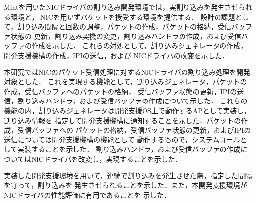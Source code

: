 \documentclass[submit,techreq,noauthor,dvipdfmx]{ipsj}
\begin{document}
Mintを用いたNICドライバの割り込み開発環境では，実割り込みを発生させられる環境と，
NICを用いずパケットを授受する環境を提供する．
設計の課題として，割り込み間隔と回数の調整，パケットの作成，パケットの格納，受信バッファ状態の
更新，割り込み契機の変更，割り込みハンドラの作成，および受信バッファの作成を示した．
これらの対処として，割り込みジェネレータの作成，開発支援機構の作成，IPIの送信，および
NICドライバの改変を示した．

本研究ではNICのパケット受信処理に対するNICドライバの割り込み処理を開発対象とした．
これを実現する機能として，割り込みジェネレータ，パケットの作成，受信バッファへのパケットの格納，
受信バッファ状態の更新，IPIの送信，割り込みハンドラ，および受信バッファの作成について示した．
これらの機能の内，割り込みジェネレータは開発支援OS上で動作するAPとして実装し，割り込み情報を
指定して開発支援機構に通知することを示した．パケットの作成，受信バッファへの
パケットの格納，受信バッファ状態の更新，およびIPIの送信については開発支援機構の機能として
動作するもので，システムコールとして実装することを示した．
割り込みハンドラ，および受信バッファの作成についてはNICドライバを改変し，実現することを示した．

実装した開発支援環境を用いて，連続で割り込みを発生させた際，指定した間隔を守って，割り込みを
発生させられることを示した．また，本開発支援環境がNICドライバの性能評価に有用であることを
示した．


\end{document}
